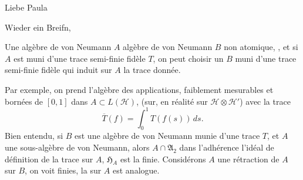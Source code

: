 
Liebe Paula\unsure{!|,}


Wieder ein Breifn,



 Une algèbre de von Neumann  $A$   algèbre de von Neumann  $B$ non atomique, , et si $A$ est muni d'une trace semi-finie fidèle $T$, on peut choisir un $B$ muni d'une trace semi-finie fidèle qui induit  sur $A$ la trace donnée.

Par exemple, on prend l'algèbre des applications,  faiblement mesurables et bornées de $[0,1]$ dans $A\subset L(\mathcal H)$,  (sur, en réalité sur $\mathcal H\otimes\mathcal H'$) avec la trace
\[
\overline T(f)=\int_0^1 T(f(s))\,ds.
\]
Bien entendu, si $B$ est une algèbre de von Neumann munie d'une trace $T$, et $A$ une sous-algèbre de von Neumann, alors $A\cap\mathfrak A_2$  dans l'adhérence  l'idéal de définition de la trace sur $A$, $\mathfrak H_A$ est la  finie. Considérons $A$ une rétraction de $A$ sur $B$, on voit   finies,  la   sur $A$ est analogue.
